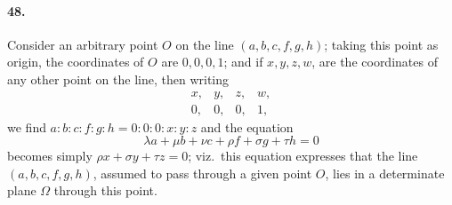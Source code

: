 \documentclass[11pt,a4paper]{article}
\begin{document}
\paragraph{48.}
Consider an arbitrary point $O$ on the line $(a,b,c,f,g,h)$; taking this point
as origin, the coordinates of $O$ are $0, 0, 0, 1$; and if $x, y, z, w$, are the coordinates
of any other point on the line, then writing
\[
\begin{array}{cccc}
x, & y, & z, & w, \\
0, & 0, & 0, & 1,
\end{array}
\]
we find $a : b : c : f : g : h = 0 : 0 : 0 : x : y : z$
and the equation
\[
\lambda a + \mu b + \nu c + \rho f + \sigma g + \tau h = 0
\]
becomes simply $\rho x + \sigma y + \tau z = 0$; viz.\ this equation expresses that the line
$(a,b,c,f,g,h)$, assumed to pass through a given point $O$, lies in a determinate plane
$\Omega$ through this point.
\end{document}
